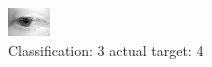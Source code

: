 \begin{figure}[h!]
\begin{center}
\includegraphics[width=0.60\columnwidth]{figures/ID2624_class_3_target_4.png}
\end{center}
\caption{ Classification: 3 actual target: 4}
\label{fig:ID2624_class_3_target_4}
\end{figure}
